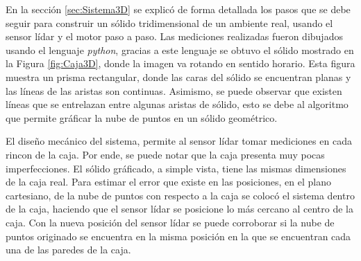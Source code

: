 En la sección \ref{sec:Sistema3D} se explicó de forma detallada los pasos que 
se debe seguir para construir un sólido tridimensional de un ambiente real, 
usando el sensor lídar y el motor paso a paso. Las mediciones realizadas fueron 
dibujados usando el lenguaje \textit{python}, gracias a este lenguaje se obtuvo 
el sólido mostrado en la Figura \ref{fig:Caja3D}, donde la imagen va rotando en 
sentido horario. Esta figura muestra un prisma rectangular, donde las caras del 
sólido se encuentran planas y las líneas de las aristas son continuas. Asimismo, 
se puede observar que existen líneas que se entrelazan entre algunas aristas de 
sólido, esto se debe al algoritmo que permite gráficar la nube de puntos en un 
sólido geométrico.

El diseño mecánico del sistema, permite al sensor lídar tomar mediciones en cada 
rincon de la caja. Por ende, se puede notar que la caja presenta muy pocas 
imperfecciones. El sólido gráficado, a simple vista, tiene las mismas dimensiones 
de la caja real. Para estimar el error que existe en las posiciones, en el 
plano cartesiano, de la nube de puntos con respecto a la caja se colocó el sistema 
dentro de la caja, haciendo que el sensor lídar se posicione lo más cercano al 
centro de la caja. Con la nueva posición del sensor lídar se puede corroborar si 
la nube de puntos originado se encuentra en la misma posición en la que 
se encuentran cada una de las paredes de la caja.

